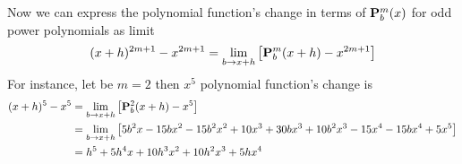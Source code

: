 Now we can express the polynomial function's change in terms of ${\mathbf{P}}\sp{m} \sb{b}(x)$ for odd power polynomials
as limit
\[
    (x+h)^{2m+1} - x^{2m+1} = \lim_{b \to x+h} \left[ {\mathbf{P}}\sp{m} \sb{b}(x+h) - x^{2m+1} \right]
\]
For instance, let be $m=2$ then $x^5$ polynomial function's change is
\begin{equation*}
    \begin{split}
        (x+h)^{5} - x^{5} &= \lim_{b \to x+h} \left[ {\mathbf{P}}\sp{2} \sb{b}(x+h) - x^{5} \right] \\
                          &= \lim_{b \to x+h} \left[ 5 b^2 x - 15 b x^2 - 15 b^2 x^2 + 10 x^3 + 30 b x^3 + 10 b^2 x^3 - 15 x^4 - 15 b x^4 + 5 x^5 \right] \\
                          &= h^5 + 5 h^4 x + 10 h^3 x^2 + 10 h^2 x^3 + 5 h x^4
    \end{split}
\end{equation*}
